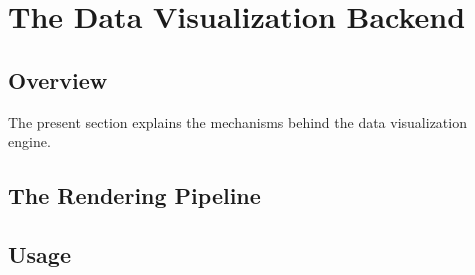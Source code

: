 %
%
%


\section{The Data Visualization Backend}
\label{section-dv-backend}

\subsection{Overview}

The present section explains the mechanisms behind the data
visualization engine.

\subsection{The Rendering Pipeline}

\subsection{Usage}
